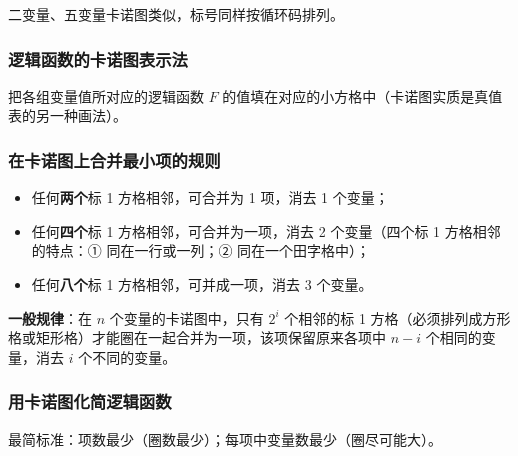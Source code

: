 二变量、五变量卡诺图类似，标号同样按循环码排列。

\subsubsection{逻辑函数的卡诺图表示法}
\label{sec:逻辑函数的卡诺图表示法}

把各组变量值所对应的逻辑函数 $F$ 的值填在对应的小方格中（卡诺图实质是真值表的另一种画法）。

\subsubsection{在卡诺图上合并最小项的规则}
\label{sec:在卡诺图上合并最小项的规则}

\begin{itemize}
	\item 任何\textbf{两个}标 1 方格相邻，可合并为 1 项，消去 1 个变量；
	\item 任何\textbf{四个}标 1 方格相邻，可合并为一项，消去 2 个变量（四个标 1 方格相邻的特点：① 同在一行或一列；② 同在一个田字格中）；
	\item 任何\textbf{八个}标 1 方格相邻，可并成一项，消去 3 个变量。
\end{itemize}

\textbf{一般规律}：在 $n$ 个变量的卡诺图中，只有 $2^i$ 个相邻的标 1 方格（必须排列成方形格或矩形格）才能圈在一起合并为一项，该项保留原来各项中 $n-i$ 个相同的变量，消去 $i$ 个不同的变量。

\subsubsection{用卡诺图化简逻辑函数}
\label{sec:用卡诺图化简逻辑函数}

最简标准：项数最少（圈数最少）；每项中变量数最少（圈尽可能大）。

